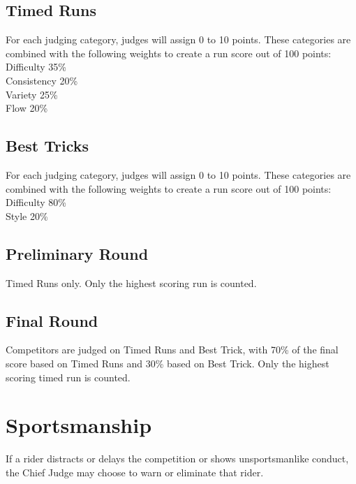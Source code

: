 \subsection{Timed Runs}
For each judging category, judges will assign 0 to 10 points. These categories are combined with the following weights to create a run score out of 100 points:\\
Difficulty 35\% \\
Consistency 20\% \\
Variety 25\% \\
Flow 20\% \\

\subsection{Best Tricks}
For each judging category, judges will assign 0 to 10 points. These categories are combined with the following weights to create a run score out of 100 points:\\
Difficulty 80\% \\
Style 20\% \\

\subsection{Preliminary Round}
Timed Runs only.
Only the highest scoring run is counted.

\subsection{Final Round}
Competitors are judged on Timed Runs and Best Trick, with 70\% of the final score based on Timed Runs and 30\% based on Best Trick.
Only the highest scoring timed run is counted.

\section{Sportsmanship}
If a rider distracts or delays the competition or shows unsportsmanlike conduct, the Chief Judge may choose to warn or eliminate that rider.
